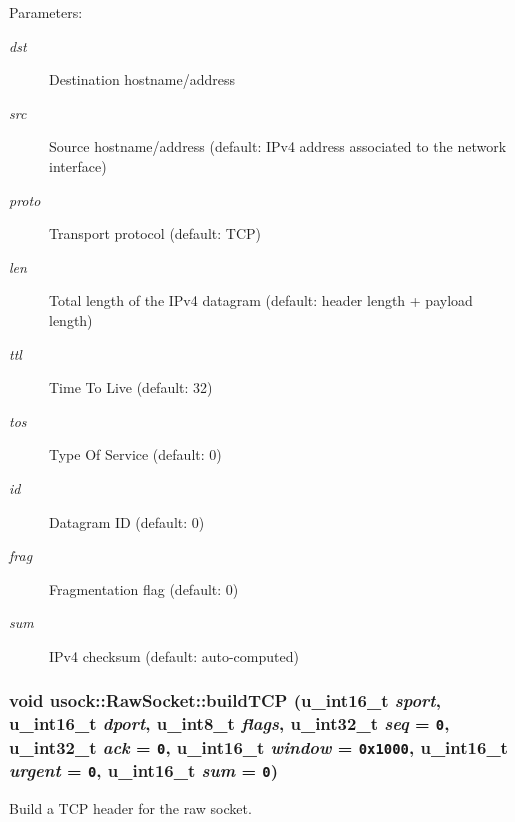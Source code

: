 \begin{Desc}
\item[Parameters:]
\begin{description}
\item[{\em dst}]Destination hostname/address \item[{\em src}]Source hostname/address (default: IPv4 address associated to the network interface) \item[{\em proto}]Transport protocol (default: TCP) \item[{\em len}]Total length of the IPv4 datagram (default: header length + payload length) \item[{\em ttl}]Time To Live (default: 32) \item[{\em tos}]Type Of Service (default: 0) \item[{\em id}]Datagram ID (default: 0) \item[{\em frag}]Fragmentation flag (default: 0) \item[{\em sum}]IPv4 checksum (default: auto-computed) \end{description}
\end{Desc}
\hypertarget{classusock_1_1RawSocket_687afa2e3259ce2bc2cea7cc49db7f14}{
\subsubsection[{buildTCP}]{\setlength{\rightskip}{0pt plus 5cm}void usock::RawSocket::buildTCP (u\_\-int16\_\-t {\em sport}, \/  u\_\-int16\_\-t {\em dport}, \/  u\_\-int8\_\-t {\em flags}, \/  u\_\-int32\_\-t {\em seq} = {\tt 0}, \/  u\_\-int32\_\-t {\em ack} = {\tt 0}, \/  u\_\-int16\_\-t {\em window} = {\tt 0x1000}, \/  u\_\-int16\_\-t {\em urgent} = {\tt 0}, \/  u\_\-int16\_\-t {\em sum} = {\tt 0})}}
\label{classusock_1_1RawSocket_687afa2e3259ce2bc2cea7cc49db7f14}


Build a TCP header for the raw socket. 

